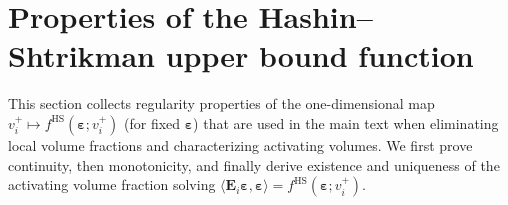 \documentclass[preprint,3p]{elsarticle}
\newcommand{\tenss}[1]{\bm{\mathbf{#1}}}            %
\newcommand{\tensf}[1]{\bm{\mathbf{#1}}}            %
\newcommand{\strain}{\tenss{\varepsilon}}           %
\newcommand{\Ei}{\tensf{E}_i}                       %
\begin{document}
\appendix
\renewcommand{\thesection}{\Alph{section}}
\renewcommand{\theproposition}{\thesection.\arabic{proposition}}

\section{Properties of the Hashin--Shtrikman upper bound function}

This section collects regularity properties of the one-dimensional map
$v_i^+\mapsto f^{\mathrm{HS}}(\strain;v_i^+)$ (for fixed $\strain$) that are used in the main text when eliminating local volume fractions and characterizing activating volumes. We first prove continuity, then monotonicity, and finally derive existence and uniqueness of the activating volume fraction solving
$\langle \Ei\strain,\strain\rangle=f^{\mathrm{HS}}(\strain;v_i^+)$.
\end{document}
